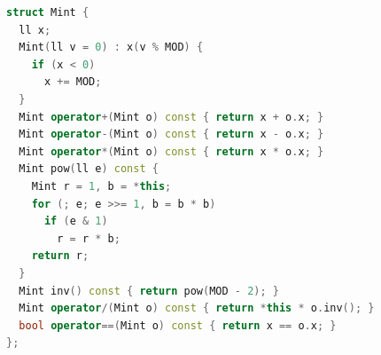 \begin{lstlisting}[language=C++]
struct Mint {
  ll x;
  Mint(ll v = 0) : x(v % MOD) {
    if (x < 0)
      x += MOD;
  }
  Mint operator+(Mint o) const { return x + o.x; }
  Mint operator-(Mint o) const { return x - o.x; }
  Mint operator*(Mint o) const { return x * o.x; }
  Mint pow(ll e) const {
    Mint r = 1, b = *this;
    for (; e; e >>= 1, b = b * b)
      if (e & 1)
        r = r * b;
    return r;
  }
  Mint inv() const { return pow(MOD - 2); }
  Mint operator/(Mint o) const { return *this * o.inv(); }
  bool operator==(Mint o) const { return x == o.x; }
};
\end{lstlisting}

